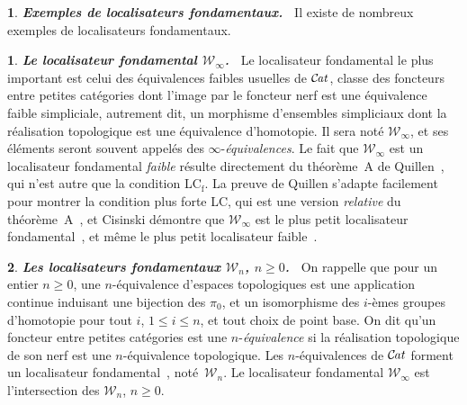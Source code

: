 \documentclass[francais]{smfart}
\theoremstyle{plain}
\theoremstyle{remark}
\theoremstyle{definition}
\newtheorem{paragr}[thm]{}
\newtheorem{subparagr}{}[thm]
\numberwithin{equation}{thm}
\begin{document}
\begin{paragr} {\emph{\textbf{{Exemples de localisateurs fondamentaux}.\ }}} Il existe de nombreux exemples de localisateurs fondamentaux.

\begin{subparagr} {\emph{\textbf{{\boldmath Le localisateur fondamental ${{\mathcal{W}}_{\infty}}$}.\ }}} \label{defWinf}
Le localisateur fondamental le plus important est celui des équivalences faibles usuelles de ${{\mathcal{C} \mspace{-2.mu} \it{at}}}$, classe des foncteurs entre petites catégories dont l'image par le foncteur nerf est une équivalence faible simpliciale, autrement dit, un morphisme d'ensembles simpliciaux dont la réalisation topologique est une équivalence d'homotopie. Il sera noté ${{\mathcal{W}}_{\infty}}$, et ses éléments seront souvent appelés des $\infty$\nobreakdash-\emph{équivalences}. Le fait que ${{\mathcal{W}}_{\infty}}$ est un localisateur fondamental \emph{faible} résulte directement du théorème~A de Quillen~\cite{Qu}, qui n'est autre que la condition LC${}_{\mathrm f}$. La preuve de Quillen s'adapte facilement pour montrer la condition plus forte LC, qui est une version \emph{relative} du théorème~A~\cite[théorème 2.1.13]{Ci2}, et Cisinski démontre que ${{\mathcal{W}}_{\infty}}$ est le plus petit localisateur fondamental~\cite[théorème 2.2.11]{Ci2}, et même le plus petit localisateur \hbox{faible~\cite[théorème~6.1.18]{CiAst}}. 
\end{subparagr}

\begin{subparagr} {\emph{\textbf{{\boldmath Les localisateurs fondamentaux ${{\mathcal{W}}_{{n}}}$, $n\geqslant0$}.\ }}} \label{defWn}
On rappelle que pour un entier $n\geqslant0$, une $n${\nobreakdash}-équivalence d'espaces topologiques est une application continue induisant une bijection des $\pi_0$, et un isomorphisme des $i${\nobreakdash}-èmes groupes d'homotopie pour tout $i$, $1\leqslant i\leqslant n$, et tout choix de point base. On dit qu'un foncteur entre petites catégories est une $n${\nobreakdash}-\emph{équivalence} si la réalisation topologique de son nerf est une $n${\nobreakdash}-équivalence topologique. Les $n${\nobreakdash}-équivalences de ${{\mathcal{C} \mspace{-2.mu} \it{at}}}$ forment un localisateur fondamental~\cite[section 9.2]{CiAst}, noté~${{\mathcal{W}}_{{n}}}$. Le localisateur fondamental ${{\mathcal{W}}_{\infty}}$ est l'intersection des ${{\mathcal{W}}_{{n}}}$, $n\geqslant0$.
\end{subparagr}


\end{paragr}
\end{document}
